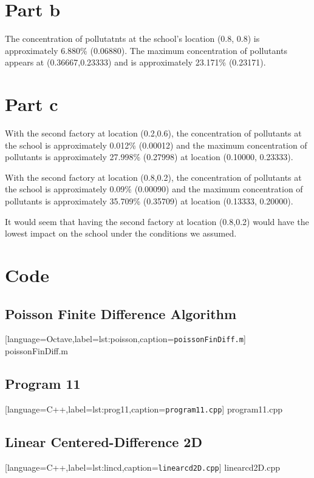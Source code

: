 \documentclass[12pt]{article}
\begin{document}
\section{Part b}
The concentration of pollutatnts at the school's location (0.8, 0.8)
is approximately 6.880\% (0.06880). The maximum concentration of
pollutants appears at (0.36667,0.23333) and is approximately 23.171\%
(0.23171). 
\section{Part c}
With the second factory at location (0.2,0.6), the concentration of
pollutants at the school is approximately 0.012\% (0.00012) and the
maximum concentration of pollutants is approximately 27.998\%
(0.27998) at location (0.10000, 0.23333).

With the second factory at location (0.8,0.2), the concentration of
pollutants at the school is approximately 0.09\% (0.00090) and the maximum
concentration of pollutants is approximately 35.709\% (0.35709) at
location (0.13333, 0.20000).

It would seem that having the second factory at location (0.8,0.2)
would have the lowest impact on the school under the conditions we assumed.
\pagebreak
\section{Code}
\subsection{Poisson Finite Difference Algorithm}

[language=Octave,label=lst:poisson,caption=\texttt{poissonFinDiff.m}]
{poissonFinDiff.m}
\pagebreak
\subsection{Program 11}

[language=C++,label=lst:prog11,caption=\texttt{program11.cpp}]
{program11.cpp}
\pagebreak
\subsection{Linear Centered-Difference 2D}

[language=C++,label=lst:lincd,caption=\texttt{linearcd2D.cpp}]
{linearcd2D.cpp}
\end{document}
